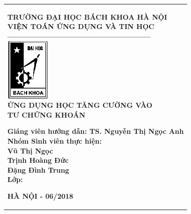 \documentclass[14pt]{extreport}
\begin{document}
\newcommand{\Khung}[2]{
\begin{tabular}{|l|}
\hline\rule[-2ex]{0pt}{5.5ex}
\parbox{#1}{#2}\\
\hline
\end{tabular}
}

\Khung{.92\textwidth}{

\begin{center}
\normalsize
\textbf{TRƯỜNG ĐẠI HỌC BÁCH KHOA HÀ NỘI}\\
\normalsize
\textbf{VIỆN TOÁN ỨNG DỤNG VÀ TIN HỌC}\\
\textbf{------------------------------------------------------}\\[0.4cm]
\includegraphics[scale=.8]{logobkdentrang}\\[1.2cm]
\textbf{{\large ỨNG DỤNG HỌC TĂNG CƯỜNG VÀO}}\\
\textbf{{\largeĐẦU TƯ CHỨNG KHOÁN}}\\
\end{center}
\begin{flushleft}
\hspace{1.5cm} \textbf{ Giáng viên hướng dẫn:{ TS. Nguyễn Thị Ngọc Anh }}\\[0.2cm]
\hspace{1.5cm} \textbf{ Nhóm Sinh viên thực hiện:}\\[0.2cm]
\hspace{7.4cm}\textbf{ Vũ Thị Ngọc}\\[0.2cm]
\hspace{7.4cm}\textbf{ Trịnh Hoàng Đức}\\[0.2cm]
\hspace{7.4cm}\textbf{ Đặng Đình Trung}\\[0.2cm]
\hspace{1.5cm} \textbf{ Lớp:\hspace{4.5cm}{ KSTN Toán Tin K60}}\\
\end{flushleft}

\vspace{1.3cm}
\begin{center}
\textbf{{\large HÀ NỘI - 06/2018}}\\
\end{center}
 }
\thispagestyle{empty}
\newpage
\end{document}
